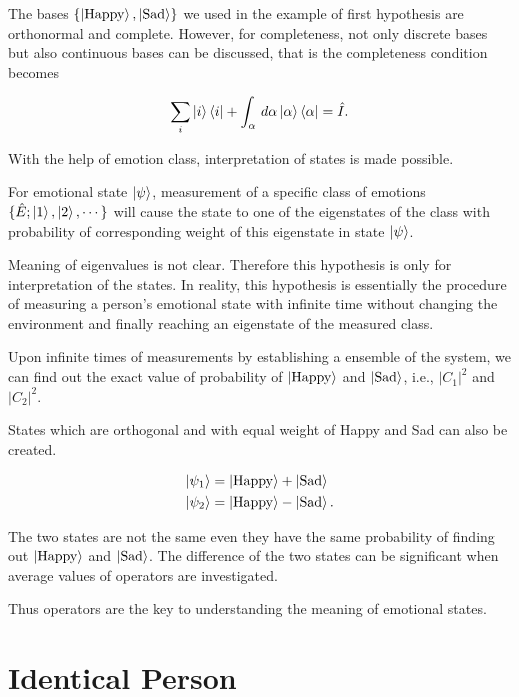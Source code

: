 \documentclass[%
 aip,
 jmp,%
 amsmath,amssymb,
 reprint,%
]{revtex4-1}
\begin{document}
The bases $\{\left| \mathrm {Happy}\right\rangle, \left| \mathrm{Sad}\right\rangle \}$ we used in the example of first hypothesis are orthonormal and complete. However, for completeness, not only discrete bases but also continuous bases can be discussed, that is the completeness condition becomes

\begin{equation}
\sum_i \left| i\right\rangle\left\langle i\right| + \int_\alpha \, d\alpha \left| \alpha\right\rangle\left\langle \alpha\right|  = \hat I .
\end{equation}

With the help of emotion class, interpretation of states is made possible.


\begin{guess}
For emotional state $\left| \psi\right\rangle$, measurement of a specific class of emotions $\{\hat E; \left| 1\right\rangle,\left| 2\right\rangle,\cdots\}$ will cause the state to one of the eigenstates of the class with probability of corresponding weight of this eigenstate in state $\left| \psi\right\rangle$.
\end{guess}

Meaning of eigenvalues is not clear. Therefore this hypothesis is only for interpretation of the states. In reality, this hypothesis is essentially the procedure of measuring a person's emotional state with infinite time without changing the environment and finally reaching an eigenstate of the measured class.

Upon infinite times of measurements by establishing a ensemble of the system, we can find out the exact value of probability of $\left| \mathrm{Happy}\right\rangle$ and $\left| \mathrm{Sad}\right\rangle$, i.e., $|C_1|^2$ and $|C_2|^2$.

States which are orthogonal and with equal weight of Happy and Sad can also be created.

\begin{align}
\left| \psi_1\right\rangle &= \left| \mathrm{Happy}\right\rangle + \left| \mathrm{Sad}\right\rangle\\
\left| \psi_2\right\rangle &= \left| \mathrm{Happy}\right\rangle - \left| \mathrm{Sad}\right\rangle .
\end{align}

The two states are not the same even they have the same probability of finding out $\left| \mathrm{Happy}\right\rangle$ and $\left| \mathrm{Sad}\right\rangle$. The difference of the two states can be significant when average values of operators are investigated.

Thus operators are the key to understanding the meaning of emotional states.



\section{Identical Person}
\end{document}
